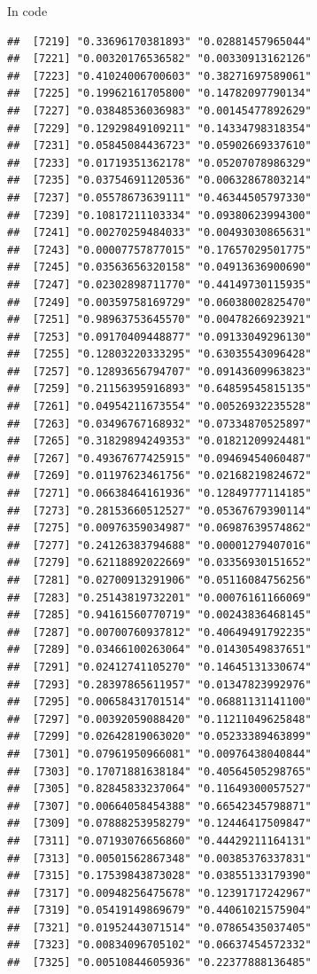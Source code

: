 \documentclass[ignorenonframetext,]{beamer}
\begin{document}
\begin{frame}[fragile]{In code}
\begin{verbatim}
##  [7219] "0.33696170381893" "0.02881457965044"
##  [7221] "0.00320176536582" "0.00330913162126"
##  [7223] "0.41024006700603" "0.38271697589061"
##  [7225] "0.19962161705800" "0.14782097790134"
##  [7227] "0.03848536036983" "0.00145477892629"
##  [7229] "0.12929849109211" "0.14334798318354"
##  [7231] "0.05845084436723" "0.05902669337610"
##  [7233] "0.01719351362178" "0.05207078986329"
##  [7235] "0.03754691120536" "0.00632867803214"
##  [7237] "0.05578673639111" "0.46344505797330"
##  [7239] "0.10817211103334" "0.09380623994300"
##  [7241] "0.00270259484033" "0.00493030865631"
##  [7243] "0.00007757877015" "0.17657029501775"
##  [7245] "0.03563656320158" "0.04913636900690"
##  [7247] "0.02302898711770" "0.44149730115935"
##  [7249] "0.00359758169729" "0.06038002825470"
##  [7251] "0.98963753645570" "0.00478266923921"
##  [7253] "0.09170409448877" "0.09133049296130"
##  [7255] "0.12803220333295" "0.63035543096428"
##  [7257] "0.12893656794707" "0.09143609963823"
##  [7259] "0.21156395916893" "0.64859545815135"
##  [7261] "0.04954211673554" "0.00526932235528"
##  [7263] "0.03496767168932" "0.07334870525897"
##  [7265] "0.31829894249353" "0.01821209924481"
##  [7267] "0.49367677425915" "0.09469454060487"
##  [7269] "0.01197623461756" "0.02168219824672"
##  [7271] "0.06638464161936" "0.12849777114185"
##  [7273] "0.28153660512527" "0.05367679390114"
##  [7275] "0.00976359034987" "0.06987639574862"
##  [7277] "0.24126383794688" "0.00001279407016"
##  [7279] "0.62118892022669" "0.03356930151652"
##  [7281] "0.02700913291906" "0.05116084756256"
##  [7283] "0.25143819732201" "0.00076161166069"
##  [7285] "0.94161560770719" "0.00243836468145"
##  [7287] "0.00700760937812" "0.40649491792235"
##  [7289] "0.03466100263064" "0.01430549837651"
##  [7291] "0.02412741105270" "0.14645131330674"
##  [7293] "0.28397865611957" "0.01347823992976"
##  [7295] "0.00658431701514" "0.06881131141100"
##  [7297] "0.00392059088420" "0.11211049625848"
##  [7299] "0.02642819063020" "0.05233389463899"
##  [7301] "0.07961950966081" "0.00976438040844"
##  [7303] "0.17071881638184" "0.40564505298765"
##  [7305] "0.82845833237064" "0.11649300057527"
##  [7307] "0.00664058454388" "0.66542345798871"
##  [7309] "0.07888253958279" "0.12446417509847"
##  [7311] "0.07193076656860" "0.44429211164131"
##  [7313] "0.00501562867348" "0.00385376337831"
##  [7315] "0.17539843873028" "0.03855133179390"
##  [7317] "0.00948256475678" "0.12391717242967"
##  [7319] "0.05419149869679" "0.44061021575904"
##  [7321] "0.01952443071514" "0.07865435037405"
##  [7323] "0.00834096705102" "0.06637454572332"
##  [7325] "0.00510844605936" "0.22377888136485"

\end{verbatim}
\end{frame}
\end{document}
